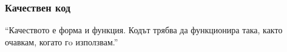 \begin{frame}
  \frametitle{Качествен код}\pause

\begin{exampleblock}{}
  {\large ``Качеството е форма и функция. \pause Кодът трябва да функционира така, както очавкам, когато гo използвам.''}
\end{exampleblock}
\end{frame}

